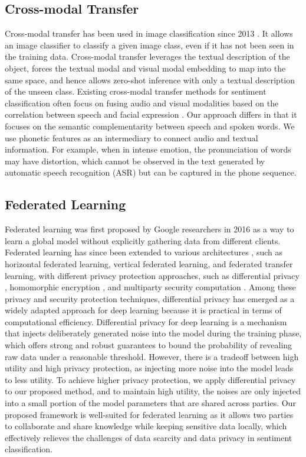 \documentclass[11pt]{article}
\begin{document}
\subsection{Cross-modal Transfer}
Cross-modal transfer has been used in image classification since 2013 \cite{Xueyang-socher2013zero}. It allows an image classifier to classify a given image class, even if it has not been seen in the training data. Cross-modal transfer leverages the textual description of the object, forces the textual modal and visual modal embedding to map into the same space, and hence allows zero-shot inference with only a textual description of the unseen class. Existing cross-modal transfer methods for sentiment classification often focus on fusing audio and visual modalities based on the correlation between speech and facial expression \cite{Xueyang-albanie2018emotion, Xueyang-dumpala2019audio}. Our approach differs in that it focuses on the semantic complementarity between speech and spoken words. We use phonetic features as an intermediary to connect audio and textual information. For example, when in intense emotion, the pronunciation of words may have distortion, which cannot be observed in the text generated by automatic speech recognition (ASR) but can be captured in the phone sequence.

\subsection{Federated Learning}
Federated learning was first proposed by Google researchers in 2016 \cite{Xueyang-mcmahan2016communication} as a way to learn a global model without explicitly gathering data from different clients. Federated learning has since been extended to various architectures \cite{Xueyang-yang2019federated,Xueyang-yang2020federated}, such as horizontal federated learning, vertical federated learning, and federated transfer learning, with different privacy protection approaches, such as differential privacy \cite{Xueyang-dwork2006calibrating}, homomorphic encryption \cite{Xueyang-rivest1978data}, and multiparty security computation \cite{Xueyang-yao1982protocols}. Among these privacy and security protection techniques, differential privacy has emerged as a widely adapted approach for deep learning because it is practical in terms of computational efficiency. Differential privacy for deep learning is a mechanism that injects deliberately generated noise into the model during the training phase, which offers strong and robust guarantees to bound the probability of revealing raw data under a reasonable threshold. However, there is a tradeoff between high utility and high privacy protection, as injecting more noise into the model leads to less utility. To achieve higher privacy protection, we apply differential privacy to our proposed method, and to maintain high utility, the noises are only injected into a small portion of the model parameters that are shared across parties. Our proposed framework is well-suited for federated learning as it allows two parties to collaborate and share knowledge while keeping sensitive data locally, which effectively relieves the challenges of data scarcity and data privacy in sentiment classification.
\end{document}
